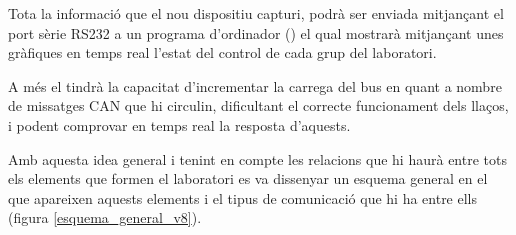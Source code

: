 Tota la informació que el nou dispositiu \Monitor capturi, podrà ser enviada mitjançant el port sèrie RS232 a un programa d'ordinador (\DCSMonitor) el qual mostrarà mitjançant unes gràfiques en temps real l'estat del control de cada grup del laboratori.

A més el \Monitor tindrà la capacitat d'incrementar la carrega del bus en quant a nombre de missatges CAN que hi circulin, dificultant el correcte funcionament dels llaços, i podent comprovar en temps real la resposta d'aquests.

Amb aquesta idea general i tenint en compte les relacions que hi haurà entre tots els elements que formen el laboratori es va dissenyar un esquema general en el que apareixen aquests elements i el tipus de comunicació que hi ha entre ells (figura \ref{esquema_general_v8}).



\begin{landscape}
\end{landscape}

